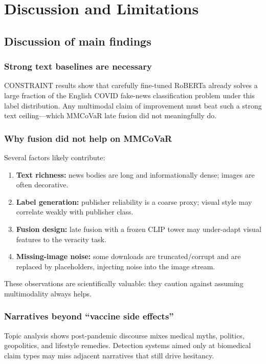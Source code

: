 \chapter{Discussion and Limitations}
\label{ch:disc}

\section{Discussion of main findings}

\subsection{Strong text baselines are necessary}
CONSTRAINT results show that carefully fine-tuned RoBERTa already solves a large fraction of the English COVID fake-news classification problem under this label distribution.
Any multimodal claim of improvement must beat such a strong text ceiling---which MMCoVaR late fusion did not meaningfully do.

\subsection{Why fusion did not help on MMCoVaR}
Several factors likely contribute:
\begin{enumerate}
  \item \textbf{Text richness:} news bodies are long and informationally dense; images are often decorative.
  \item \textbf{Label generation:} publisher reliability is a coarse proxy; visual style may correlate weakly with publisher class.
  \item \textbf{Fusion design:} late fusion with a frozen CLIP tower may under-adapt visual features to the veracity task.
  \item \textbf{Missing-image noise:} some downloads are truncated/corrupt and are replaced by placeholders, injecting noise into the image stream.
\end{enumerate}
These observations are scientifically valuable: they caution against assuming multimodality always helps.

\subsection{Narratives beyond ``vaccine side effects''}
Topic analysis shows post-pandemic discourse mixes medical myths, politics, geopolitics, and lifestyle remedies.
Detection systems aimed only at biomedical claim types may miss adjacent narratives that still drive hesitancy.

